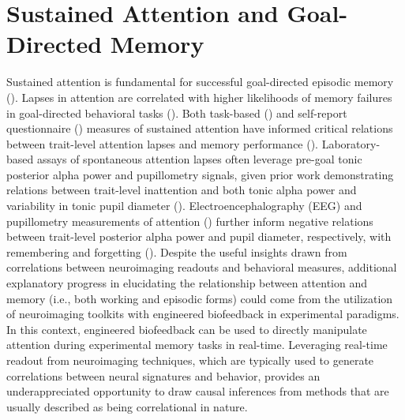 \section{Sustained Attention and Goal-Directed Memory}
Sustained attention is fundamental for successful goal-directed episodic memory (\cite{baddeley1984attention, craik1996effects, anderson1995status, evans2019pre, curran2004effects}). Lapses in attention are correlated with higher likelihoods of memory failures in goal-directed behavioral tasks (\cite{madore2020memory}). Both task-based (\cite{esterman2013zone, rosenberg2013sustaining}) and self-report questionnaire (\cite{ophir2009cognitive, ralph2014media, kessler2005world, patton1995factor, green2007action, carriere2008everyday, carriere2013wandering}) measures of sustained attention have informed critical relations between trait-level attention lapses and memory performance (\cite{madore2020memory}). Laboratory-based assays of spontaneous attention lapses often leverage pre-goal tonic posterior alpha power and pupillometry signals, given prior work demonstrating relations between trait-level inattention and both tonic alpha power and variability in tonic pupil diameter (\cite{unsworth2017importance, klimesch2012alpha}). Electroencephalography (EEG) and pupillometry measurements of attention (\cite{macdonald2011trial, unsworth2018tracking}) further inform negative relations between trait-level posterior alpha power and pupil diameter, respectively, with remembering and forgetting (\cite{madore2020memory}). Despite the useful insights drawn from correlations between neuroimaging readouts and behavioral measures, additional explanatory progress in elucidating the relationship between attention and memory (i.e., both working and episodic forms) could come from the utilization of neuroimaging toolkits with engineered biofeedback in experimental paradigms. In this context, engineered biofeedback can be used to directly manipulate attention during experimental memory tasks in real-time. Leveraging real-time readout from neuroimaging techniques, which are typically used to generate correlations between neural signatures and behavior, provides an underappreciated opportunity to draw causal inferences from methods that are usually described as being correlational in nature.

